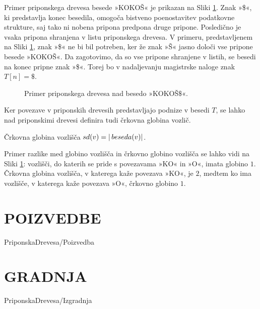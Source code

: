
Primer priponskega drevesa besede »KOKOŠ« je prikazan na Sliki \ref{fig:PriponskoDrevo}. Znak »\$«, ki predstavlja konec besedila, omogoča bistveno poenostavitev podatkovne strukture, saj tako ni nobena pripona predpona druge pripone. Posledično je vsaka pripona shranjena v listu priponskega drevesa. V primeru, predstavljenem na Sliki \ref{fig:PriponskoDrevo}, znak »\$« ne bi bil potreben, ker že znak »Š« jasno določi vse pripone besede »KOKOŠ«. Da zagotovimo, da so vse pripone shranjene v listih, se besedi na konec pripne znak »\$«. Torej bo v nadaljevanju magistrske naloge znak $T[n]=\$$.

\begin{figure}[tb]
    \begin{center}
        
        \caption{Primer priponskega drevesa nad besedo »KOKOŠ$\$$«.} 
        \label{fig:PriponskoDrevo}
    \end{center}
\end{figure}


%
%
Ker povezave v priponskih drevesih predstavljajo podnize v besedi $T$, se lahko nad priponskimi drevesi definira tudi črkovna globina vozlič.



\begin{defi}
    Črkovna globina vozlišča $ \mathop{sd}(v) =| \mathop{beseda}(v)|$.
\end{defi}

Primer razlike med globino vozlišča in črkovno globino vozlišča se lahko vidi na Sliki \ref{fig:PriponskoDrevo}: vozlišči, do katerih se pride s povezavama »KO« in »O«, imata globino $1$. Črkovna globina vozlišča, v katerega kaže povezava »KO«, je $2$, medtem ko ima vozlišče, v katerega kaže povezava »O«, črkovno globino $1$. 

\section{POIZVEDBE}\label{sec:poizvedba}
{PriponskaDrevesa/Poizvedba}

\section{GRADNJA}\label{sec:izgradnja}
{PriponskaDrevesa/Izgradnja}

